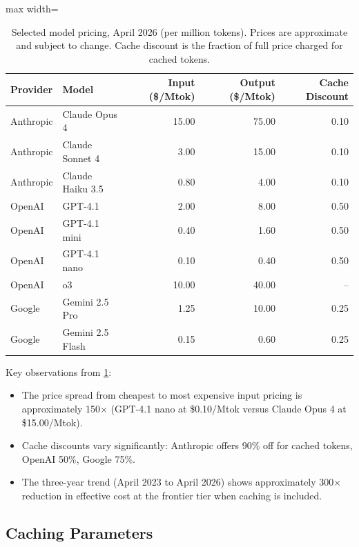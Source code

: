 \documentclass[11pt, a4paper, copyright]{googledeepmind}
\begin{document}
\begin{table}[t]
\centering
\caption{Selected model pricing, April 2026 (per million tokens). Prices are approximate and subject to change. Cache discount is the fraction of full price charged for cached tokens.}
\label{tab:pricing}
\begin{adjustbox}{max width=\textwidth}
\begin{tabular}{llrrr}
\toprule
\textbf{Provider} & \textbf{Model} & \textbf{Input (\$/Mtok)} & \textbf{Output (\$/Mtok)} & \textbf{Cache Discount} \\
\midrule
Anthropic & Claude Opus 4 & 15.00 & 75.00 & 0.10 \\
Anthropic & Claude Sonnet 4 & 3.00 & 15.00 & 0.10 \\
Anthropic & Claude Haiku 3.5 & 0.80 & 4.00 & 0.10 \\
\midrule
OpenAI & GPT-4.1 & 2.00 & 8.00 & 0.50 \\
OpenAI & GPT-4.1 mini & 0.40 & 1.60 & 0.50 \\
OpenAI & GPT-4.1 nano & 0.10 & 0.40 & 0.50 \\
OpenAI & o3 & 10.00 & 40.00 & -- \\
\midrule
Google & Gemini 2.5 Pro & 1.25 & 10.00 & 0.25 \\
Google & Gemini 2.5 Flash & 0.15 & 0.60 & 0.25 \\
\bottomrule
\end{tabular}
\end{adjustbox}
\end{table}

Key observations from \cref{tab:pricing}:
\begin{itemize}[nosep]
    \item The price spread from cheapest to most expensive input pricing is approximately 150$\times$ (GPT-4.1 nano at \$0.10/Mtok versus Claude Opus 4 at \$15.00/Mtok).
    \item Cache discounts vary significantly: Anthropic offers 90\% off for cached tokens, OpenAI 50\%, Google 75\%.
    \item The three-year trend (April 2023 to April 2026) shows approximately 300$\times$ reduction in effective cost at the frontier tier when caching is included.
\end{itemize}

\subsection{Caching Parameters}
\end{document}
